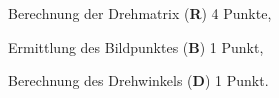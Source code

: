 \begin{bewertung}
\begin{teilaufgaben}
\item
Berechnung der Drehmatrix ({\bf R}) 4 Punkte,
\item
Ermittlung des Bildpunktes ({\bf B}) 1 Punkt,
\item
Berechnung des Drehwinkels ({\bf D}) 1 Punkt.
\end{teilaufgaben}
\end{bewertung}


